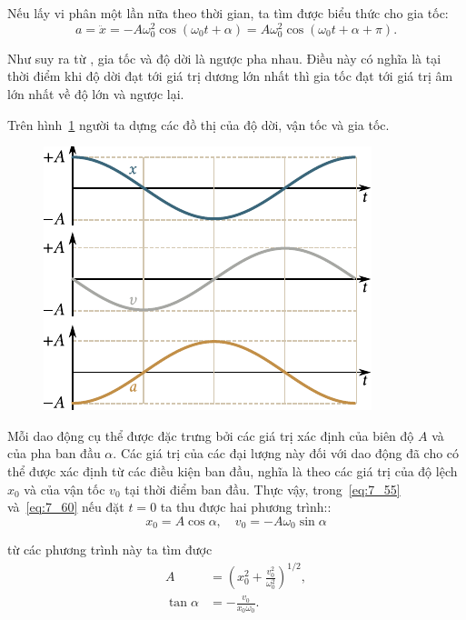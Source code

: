 Nếu lấy vi phân  một lần nữa theo thời gian, ta tìm được biểu thức cho gia tốc:
\begin{equation}\label{eq:7_61}
	a = \ddot{x} = -A\omega_0^2\cos(\omega_0 t + \alpha) = A\omega_0^2\cos(\omega_0 t + \alpha + \pi).
\end{equation}

\noindent
Như suy ra từ , gia tốc và độ dời là ngược pha nhau. Điều này có nghĩa là tại thời điểm khi độ dời đạt tới giá trị dương lớn nhất thì gia tốc đạt tới giá trị âm lớn nhất về độ lớn và ngược lại.

Trên hình~\ref{fig:7_5} người ta dựng các đồ thị của độ dời, vận tốc và gia tốc.

\begin{figure}[!htb]
	\begin{center}
		\includegraphics[scale=0.95]{figures/ch_07/fig_7_5.pdf}
		\caption[]{}
		\label{fig:7_5}
	\end{center}
\end{figure}

Mỗi dao động cụ thể được đặc trưng bởi các giá trị xác định của biên độ $A$ và của pha ban đầu $\alpha$. Các giá trị của các đại lượng này đối với dao động đã cho có thể được xác định từ các điều kiện ban đầu, nghĩa là theo các giá trị của độ lệch $x_0$ và của vận tốc $v_0$ tại thời điểm ban đầu. Thực vậy, trong~\eqref{eq:7_55} và~\eqref{eq:7_60} nếu đặt $t=0$ ta thu được hai phương trình::
\begin{equation*}
	x_0 = A\cos\alpha,\quad v_0 = -A\omega_0\sin\alpha
\end{equation*}

\noindent
từ các phương trình này ta tìm được
\begin{align}
	A &= \left(x_0^2 + \frac{v_0^2}{\omega_0^2}\right)^{1/2}, \label{eq:7_62}\\
	\tan\alpha &= -\frac{v_0}{x_0\omega_0}.\label{eq:7_63}
\end{align}

